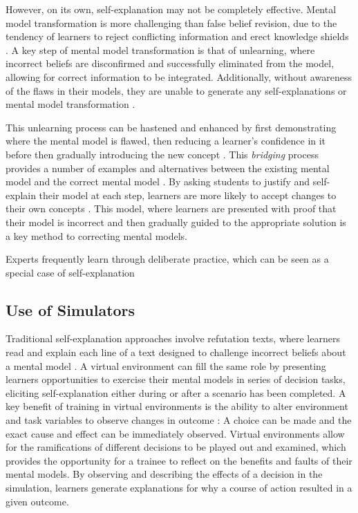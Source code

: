 However, on its own, self-explanation may not be completely effective. Mental model transformation is more challenging than false belief revision, due to the tendency of learners to reject conflicting information and erect knowledge shields \citep{Klein2006}. A key step of mental model transformation is that of unlearning, where incorrect beliefs are disconfirmed and successfully eliminated from the model, allowing for correct information to be integrated. Additionally, without awareness of the flaws in their models, they are unable to generate any self-explanations \citep{Chi2002} or mental model transformation \citep{Chi2008}.

This unlearning process can be hastened and enhanced by first demonstrating where the mental model is flawed, then reducing a learner's confidence in it before then gradually introducing the new concept \citep{Klein2006}. This \emph{bridging} process provides a number of examples and alternatives between the existing mental model and the correct mental model \citep{Brown1989}. By asking students to justify and self-explain their model at each step, learners are more likely to accept changes to their own concepts \citep{Brown1989, Chi2008, Chi1994, Klein2006}. This model, where learners are presented with proof that their model is incorrect and then gradually guided to the appropriate solution is a key method to correcting mental models.

Experts frequently learn through deliberate practice, which can be seen as a special case of self-explanation

\subsection{Use of Simulators}

Traditional self-explanation approaches involve refutation texts, where learners read and explain each line of a text designed to challenge incorrect beliefs about a mental model \citep{Chi1994}. A virtual environment can fill the same role by presenting learners opportunities to exercise their mental models in series of decision tasks, eliciting self-explanation either during or after a scenario has been completed. A key benefit of training in virtual environments is the ability to alter environment and task variables to observe changes in outcome \citep{Klein2006}: A choice can be made and the exact cause and effect can be immediately observed. Virtual environments allow for the ramifications of different decisions to be played out and examined, which provides the opportunity for a trainee to reflect on the benefits and faults of their mental models. By observing and describing the effects of a decision in the simulation, learners generate explanations for why a course of action resulted in a given outcome.

